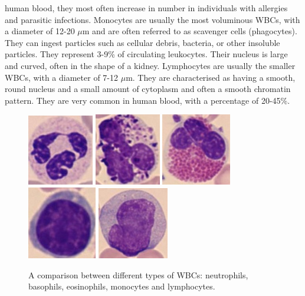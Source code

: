 \documentclass[final,a4paper,12pt,english]{UnicaPhdThesis3}
\begin{document}
human blood, they most often increase in number in individuals with allergies and parasitic infections. Monocytes are usually the most voluminous WBCs, with a diameter of 12-20 $\mu$m and are often referred to as scavenger cells (phagocytes). They can ingest particles such as cellular debris, bacteria, or other insoluble particles. They represent 3-9\% of circulating leukocytes. Their nucleus is large and curved, often in the shape of a kidney. Lymphocytes are usually the smaller WBCs, with a diameter of 7-12 $\mu$m. They are characterised as having a smooth, round nucleus and a small amount of cytoplasm and often a smooth chromatin pattern. They are very common in human blood, with a percentage of 20-45\%. 

\begin{figure}[!htbp]
\centering
\includegraphics[height=0.125\textheight]{images/crop-Fig2-1}
\includegraphics[height=0.125\textheight]{images/crop-Fig2-2}
\includegraphics[height=0.125\textheight]{images/crop-Fig2-3}
\includegraphics[height=0.125\textheight]{images/crop-Fig2-4}
\includegraphics[height=0.125\textheight]{images/crop-Fig2-5}
\caption{\label{fig:leukocytes}A comparison between different types of WBCs: neutrophils, basophils, eosinophils, monocytes and lymphocytes.}
\end{figure}
\end{document}
